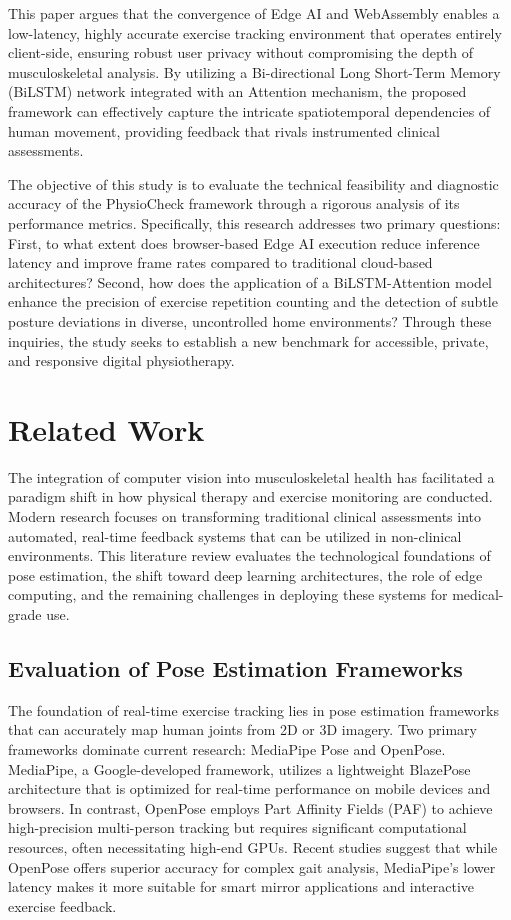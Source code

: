 \documentclass[conference]{IEEEtran}
\begin{document}
This paper argues that the convergence of Edge AI and WebAssembly enables a low-latency, highly accurate exercise tracking environment that operates entirely client-side, ensuring robust user privacy without compromising the depth of musculoskeletal analysis. By utilizing a Bi-directional Long Short-Term Memory (BiLSTM) network integrated with an Attention mechanism, the proposed framework can effectively capture the intricate spatiotemporal dependencies of human movement, providing feedback that rivals instrumented clinical assessments.

The objective of this study is to evaluate the technical feasibility and diagnostic accuracy of the PhysioCheck framework through a rigorous analysis of its performance metrics. Specifically, this research addresses two primary questions: First, to what extent does browser-based Edge AI execution reduce inference latency and improve frame rates compared to traditional cloud-based architectures? Second, how does the application of a BiLSTM-Attention model enhance the precision of exercise repetition counting and the detection of subtle posture deviations in diverse, uncontrolled home environments? Through these inquiries, the study seeks to establish a new benchmark for accessible, private, and responsive digital physiotherapy.

\section{Related Work}

The integration of computer vision into musculoskeletal health has facilitated a paradigm shift in how physical therapy and exercise monitoring are conducted. Modern research focuses on transforming traditional clinical assessments into automated, real-time feedback systems that can be utilized in non-clinical environments. This literature review evaluates the technological foundations of pose estimation, the shift toward deep learning architectures, the role of edge computing, and the remaining challenges in deploying these systems for medical-grade use.

\subsection{Evaluation of Pose Estimation Frameworks}
The foundation of real-time exercise tracking lies in pose estimation frameworks that can accurately map human joints from 2D or 3D imagery. Two primary frameworks dominate current research: MediaPipe Pose and OpenPose. MediaPipe, a Google-developed framework, utilizes a lightweight BlazePose architecture that is optimized for real-time performance on mobile devices and browsers. In contrast, OpenPose employs Part Affinity Fields (PAF) to achieve high-precision multi-person tracking but requires significant computational resources, often necessitating high-end GPUs. Recent studies suggest that while OpenPose offers superior accuracy for complex gait analysis, MediaPipe’s lower latency makes it more suitable for smart mirror applications and interactive exercise feedback.
\end{document}
